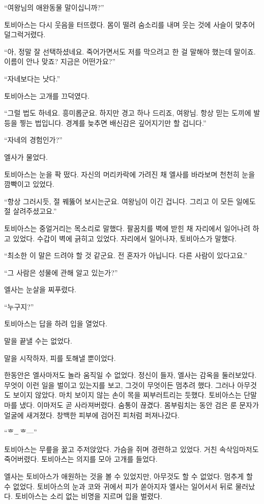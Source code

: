 ``여왕님의 애완동물 말이십니까?''

토비아스는 다시 웃음을 터뜨렸다. 몸이 떨려 숨소리를 내며 웃는 것에 사슬이 맞추어 덜그럭거렸다.

``아, 정말 잘 선택하셨네요. 죽어가면서도 저를 막으려고 한 걸 말해야 했는데 말이죠. 이름이 안나 맞죠? 지금은 어떤가요?''

``자네보다는 낫다.''

토비아스는 고개를 끄덕였다.

``그럴 법도 하네요. 흥미롭군요. 하지만 경고 하나 드리죠, 여왕님. 항상 믿는 도끼에 발등을 찧는 법입니다. 경계를 늦추면 배신감은 깊어지기만 할 겁니다.''

``자네의 경험인가?''

엘사가 물었다.

토비아스는 눈을 팍 떴다. 자신의 머리카락에 가려진 채 엘사를 바라보며 천천히 눈을 깜빡이고 있었다.

``항상 그러시듯, 절 꿰뚫어 보시는군요. 여왕님이 이긴 겁니다. 그리고 이 모든 일에도 절 살려주셨고요.''

토비아스는 중얼거리는 목소리로 말했다. 팔꿈치를 벽에 받힌 채 자리에서 일어나려 하고 있었다. 수갑이 벽에 긁히고 있었다. 자리에서 일어나자, 토비아스가 말했다.

``최소한 이 말은 드려야 할 것 같군요. 전 혼자가 아닙니다. 다른 사람이 있다고요.''

``그 사람은 성물에 관해 알고 있는가?''

엘사는 눈살을 찌푸렸다.

``누구지?''

토비아스는 답을 하려 입을 열었다.

말을 끝낼 수는 없었다.

말을 시작하자, 피를 토해낼 뿐이었다.

한동안은 엘사마저도 놀라 움직일 수 없었다. 정신이 들자, 엘사는 감옥을 둘러보았다. 무엇이 이런 일을 벌이고 있는지를 보고, 그것이 무엇이든 멈추려 했다. 그러나 아무것도 보이지 않았다. 마치 보이지 않는 손이 목을 찌부러트리는 듯했다. 토비아스는 단말마를 냈다. 이마저도 곧 사라져버렸다. 숨통이 끊겼다. 몸부림치는 동안 검은 룬 문자가 얼굴에 새겨졌다. 창백한 피부에 검어진 피처럼 퍼져나갔다.

``ᄒ\ldots\,ᄒ—''

토비아스는 무릎을 꿇고 주저앉았다. 가슴을 쥐며 경련하고 있었다. 거친 속삭임마저도 죽어버렸다. 토비아스는 의지를 모아 고개를 들었다.

엘사는 토비아스가 애원하는 것을 볼 수 있었지만, 아무것도 할 수 없었다. 멈추게 할 수 없었다. 토비아스의 눈과 코와 귀에서 피가 쏟아지자 엘사는 일어서서 뒤로 물러났다. 토비아스는 소리 없는 비명을 지르며 입을 벌렸다.

